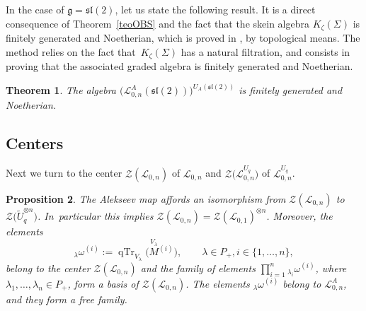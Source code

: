 \documentclass[pdftex]{sigma}%
\numberwithin{equation}{section}
\numberwithin{figure}{section}
\newtheorem{teo}{Theorem}[section]
\newtheorem{prop}[teo]{Proposition}
\newcommand{\Ll}{{\mathcal L}}
\begin{document}
In the case of $\mathfrak{g} = {\mathfrak{sl}}(2)$, let us state the following result. It is a direct consequence of Theo\-rem~\ref{teoOBS} and the fact that the skein algebra $K_\zeta(\Sigma)$ is finitely generated and Noetherian, which is proved in \cite[Theorem 3]{PS}, by topological means. The method relies on the fact that~$K_\zeta(\Sigma)$ has a natural filtration, and consists in proving that the associated graded algebra is finitely generated and Noetherian.
\begin{teo}%
The algebra $\big(\Ll_{0,n}^A({\mathfrak{sl}}(2))\big)^{U_A({\mathfrak{sl}}(2))}$ is finitely generated and Noetherian.
\end{teo}

\subsection{Centers}
Next we turn to the center $\mathcal{Z}(\Ll_{0,n})$ of $\Ll_{0,n}$ and $\mathcal{Z}\big(\Ll_{0,n}^{U_q}\big)$ of $\Ll_{0,n}^{U_q}$.
\begin{prop} \label{center0n}
The Alekseev map affords an isomorphism from $\mathcal{Z}(\Ll_{0,n})$ to $\mathcal{Z}\big(\tilde U_q^{\otimes n}\big)$. In~particular this implies $\mathcal{Z}(\Ll_{0,n}) = \mathcal{Z}(\Ll_{0,1})^{\otimes n}$. Moreover, the elements
\[
{}_{\lambda}\omega^{(i)}:= \operatorname{qTr}_{V_{\lambda}}\big(\!\stackrel{V_{\lambda}}{M}{}^{\!\! (i)}\big), \qquad
\lambda\in P_+, i\in \{1,\dots,n\},
\]
belong to the center $\mathcal{Z}(\Ll_{0,n})$ and the family of elements
$\textstyle \prod_{i=1}^n {}_{\lambda_i}\omega^{(i)}$, where $\lambda_1,\dots,\lambda_n\in P_+$, form a basis of $\mathcal{Z}(\Ll_{0,n})$. The elements ${}_{\lambda}\omega^{(i)}$ belong to $\Ll_{0,n}^A$, and they form a free family.
\end{prop}
\end{document}
